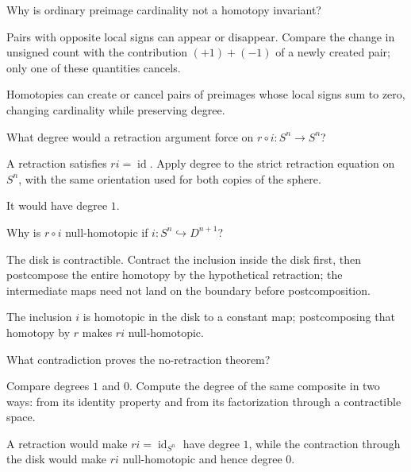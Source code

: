 \begin{exercise}\label{exr:viii03-19}
Why is ordinary preimage cardinality not a homotopy invariant?
\end{exercise}
\begin{hint}Pairs with opposite local signs can appear or disappear.
Compare the change in unsigned count with the contribution \((+1)+(-1)\) of a newly created pair; only one of these quantities cancels.
\end{hint}
\begin{solution}
Homotopies can create or cancel pairs of preimages whose local signs sum to
zero, changing cardinality while preserving degree.
\end{solution}

\begin{exercise}\label{exr:viii03-20}
What degree would a retraction argument force on
\(r\circ i:S^n\to S^n\)?
\end{exercise}
\begin{hint}A retraction satisfies \(ri=\operatorname{id}\).
Apply degree to the strict retraction equation on \(S^n\), with the same orientation used for both copies of the sphere.
\end{hint}
\begin{solution}
It would have degree \(1\).
\end{solution}

\begin{exercise}\label{exr:viii03-21}
Why is \(r\circ i\) null-homotopic if \(i:S^n\hookrightarrow D^{n+1}\)?
\end{exercise}
\begin{hint}The disk is contractible.
Contract the inclusion inside the disk first, then postcompose the entire homotopy by the hypothetical retraction; the intermediate maps need not land on the boundary before postcomposition.
\end{hint}
\begin{solution}
The inclusion \(i\) is homotopic in the disk to a constant map; postcomposing
that homotopy by \(r\) makes \(ri\) null-homotopic.
\end{solution}

\begin{exercise}\label{exr:viii03-22}
What contradiction proves the no-retraction theorem?
\end{exercise}
\begin{hint}Compare degrees \(1\) and \(0\).
Compute the degree of the same composite in two ways: from its identity property and from its factorization through a contractible space.
\end{hint}
\begin{solution}
A retraction would make \(ri=\operatorname{id}_{S^n}\) have degree \(1\), while
the contraction through the disk would make \(ri\) null-homotopic and hence
degree \(0\).
\end{solution}

